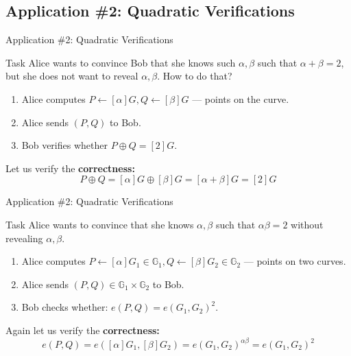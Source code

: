 \documentclass[xcolor={usenames,dvipsnames}]{beamer}
\begin{document}
    \subsection{Application \#2: Quadratic Verifications}
    \begin{frame}{Application \#2: Quadratic Verifications}
        \begin{block}{Task}
            Alice wants to convince Bob that she knows such $\alpha,\beta$ such that $\alpha + \beta = 2$, but she does not want to reveal $\alpha,\beta$. How to do that?
        \end{block}

        \begin{example}
            \begin{enumerate}
                \item Alice computes $P \gets [\alpha]G, Q \gets [\beta]G$ --- points on the curve.
                \item  Alice sends $(P,Q)$ to Bob.
                \item  Bob verifies whether $P\oplus Q = [2]G$.
            \end{enumerate}
            
             Let us verify the \textbf{correctness:} 
            \begin{equation*}
                P\oplus Q = [\alpha]G \oplus [\beta]G = [\alpha+\beta]G = [2]G
            \end{equation*}
        \end{example}
    \end{frame}

    \begin{frame}{Application \#2: Quadratic Verifications}
        \begin{block}{Task}
            Alice wants to convince that she knows $\alpha,\beta$ such that $\alpha\beta=2$ without revealing $\alpha,\beta$.
        \end{block}

        \begin{example}
            \begin{enumerate}
                \item Alice computes $P \gets [\alpha]G_1 \in \mathbb{G}_1, Q \gets [\beta]G_2 \in \mathbb{G}_2$ --- points on two curves.
                \item  Alice sends $(P,Q) \in \mathbb{G}_1 \times \mathbb{G}_2$ to Bob.
                \item  Bob checks whether: $e(P,Q) = e(G_1,G_2)^{2}$.
            \end{enumerate}
            
             Again let us verify the \textbf{correctness:} 
            \begin{equation*}
                e(P,Q) = e([\alpha]G_1,[\beta]G_2) = e(G_1,G_2)^{\alpha\beta} = e(G_1,G_2)^{2}
            \end{equation*}
        \end{example}
    \end{frame}
\end{document}
